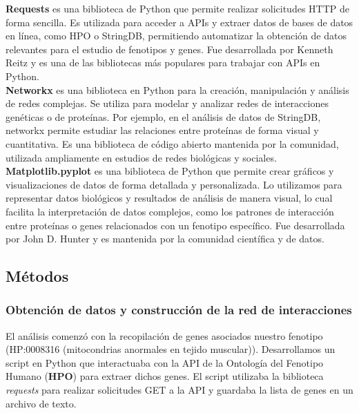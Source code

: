 \textbf{Requests} es una biblioteca de Python que permite realizar solicitudes HTTP de forma sencilla.
Es utilizada para acceder a APIs y extraer datos de bases de datos en línea, como HPO o StringDB, permitiendo automatizar la obtención de datos relevantes para el estudio de fenotipos y genes.
Fue desarrollada por Kenneth Reitz y es una de las bibliotecas más populares para trabajar con APIs en Python.\cite{chandra2015python}\\


\textbf{Networkx} es una biblioteca en Python para la creación, manipulación y análisis de redes complejas.
Se utiliza para modelar y analizar redes de interacciones genéticas o de proteínas. Por ejemplo, en el análisis de datos de StringDB, networkx permite estudiar las relaciones entre proteínas de forma visual y cuantitativa.
Es una biblioteca de código abierto mantenida por la comunidad, utilizada ampliamente en estudios de redes biológicas y sociales.\cite{hagberg2020networkx}\\


\textbf{Matplotlib.pyplot} es una biblioteca de Python que permite crear gráficos y visualizaciones de datos de forma detallada y personalizada.
Lo utilizamos para representar datos biológicos y resultados de análisis de manera visual, lo cual facilita la interpretación de datos complejos, como los patrones de interacción entre proteínas o genes relacionados con un fenotipo específico.
Fue desarrollada por John D. Hunter y es mantenida por la comunidad científica y de datos.\cite{ari2014matplotlib}



\subsection{\textbf{Métodos}}


\subsubsection{\textbf{Obtención de datos y construcción de la red de interacciones}}

El análisis comenzó con la recopilación de genes asociados nuestro fenotipo (HP:0008316 (mitocondrias anormales en tejido muscular)). Desarrollamos un script en Python que interactuaba con la API de la Ontología del Fenotipo Humano (\textbf{HPO}) para extraer dichos genes. El script utilizaba la biblioteca \textit{requests} para realizar solicitudes GET a la API y guardaba la lista de genes en un archivo de texto.


